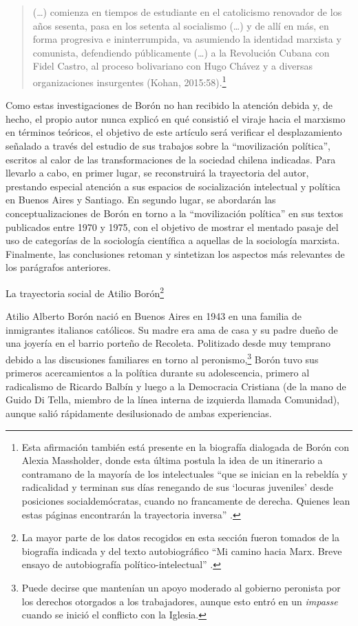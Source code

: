 \begin{quote}
(\dots) comienza en tiempos de estudiante en el catolicismo renovador de los años sesenta, pasa en los setenta al socialismo (\dots) y de allí en más, en forma progresiva e ininterrumpida, va asumiendo la identidad marxista y comunista, defendiendo públicamente (\dots) a la Revolución Cubana con Fidel Castro, al proceso bolivariano con Hugo Chávez y a diversas organizaciones insurgentes (Kohan, 2015:58).\footnote{Esta afirmación también está presente en la biografía dialogada de Borón con Alexia Massholder, donde esta última postula la idea de un itinerario a contramano de la mayoría de los intelectuales \enquote{que se inician en la rebeldía y radicalidad y terminan sus días renegando de sus \enquote{locuras juveniles} desde posiciones socialdemócratas, cuando no francamente de derecha. Quienes lean estas páginas encontrarán la trayectoria inversa} \parencite[8]{1444-BORON2023}.}
\end{quote}

Como estas investigaciones de Borón no han recibido la atención debida y, de hecho, el propio autor nunca explicó en qué consistió el viraje hacia el marxismo en términos teóricos, el objetivo de este artículo será verificar el desplazamiento señalado a través del estudio de sus trabajos sobre la \enquote{movilización política}, escritos al calor de las transformaciones de la sociedad chilena indicadas. Para llevarlo a cabo, en primer lugar, se reconstruirá la trayectoria del autor, prestando especial atención a sus espacios de socialización intelectual y política en Buenos Aires y Santiago. En segundo lugar, se abordarán las conceptualizaciones de Borón en torno a la \enquote{movilización política} en sus textos publicados entre 1970 y 1975, con el objetivo de mostrar el mentado pasaje del uso de categorías de la sociología científica a aquellas de la sociología marxista. Finalmente, las conclusiones retoman y sintetizan los aspectos más relevantes de los parágrafos anteriores.

La trayectoria social de Atilio Borón\footnote{La mayor parte de los datos recogidos en esta sección fueron tomados de la biografía indicada \parencite{1444-BORON2023} y del texto autobiográfico \enquote{Mi camino hacia Marx. Breve ensayo de autobiografía político-intelectual} \parencite{1568-BORON2020}.}

Atilio Alberto Borón nació en Buenos Aires en 1943 en una familia de inmigrantes italianos católicos. Su madre era ama de casa y su padre dueño de una joyería en el barrio porteño de Recoleta. Politizado desde muy temprano debido a las discusiones familiares en torno al peronismo,\footnote{Puede decirse que mantenían un apoyo moderado al gobierno peronista por los derechos otorgados a los trabajadores, aunque esto entró en un \emph{impasse} cuando se inició el conflicto con la Iglesia.} Borón tuvo sus primeros acercamientos a la política durante su adolescencia, primero al radicalismo de Ricardo Balbín y luego a la Democracia Cristiana (de la mano de Guido Di Tella, miembro de la línea interna de izquierda llamada Comunidad), aunque salió rápidamente desilusionado de ambas experiencias.

